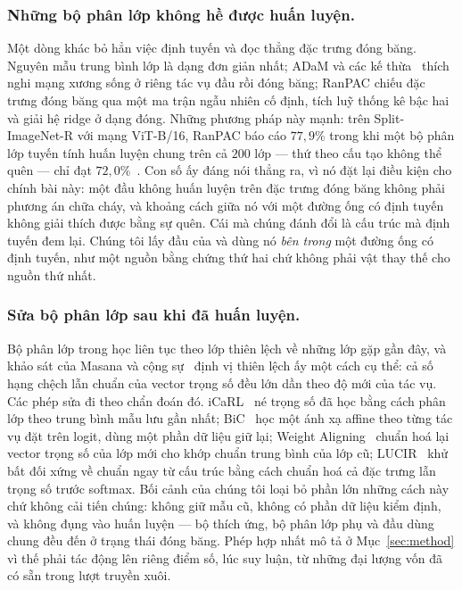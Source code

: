 \documentclass[runningheads]{llncs}
\begin{document}
\subsubsection{Những bộ phân lớp không hề được huấn luyện.}
Một dòng khác bỏ hẳn việc định tuyến và đọc thẳng đặc trưng đóng băng. Nguyên
mẫu trung bình lớp là dạng đơn giản nhất; ADaM và các kế thừa~\cite{ref_adam}
thích nghi mạng xương sống ở riêng tác vụ đầu rồi đóng băng; RanPAC
\cite{ref_ranpac} chiếu đặc trưng đóng băng qua một ma trận ngẫu nhiên cố định,
tích luỹ thống kê bậc hai và giải hệ ridge ở dạng đóng. Những phương pháp này
mạnh: trên Split-ImageNet-R với mạng ViT-B/16, RanPAC báo cáo $77{,}9\%$ trong
khi một bộ phân lớp tuyến tính huấn luyện chung trên cả $200$ lớp --- thứ theo
cấu tạo không thể quên --- chỉ đạt $72{,}0\%$~\cite{ref_ranpac}. Con số ấy đáng
nói thẳng ra, vì nó đặt lại điều kiện cho chính bài này: một đầu không huấn
luyện trên đặc trưng đóng băng không phải phương án chữa cháy, và khoảng cách
giữa nó với một đường ống có định tuyến không giải thích được bằng sự quên. Cái
mà chúng đánh đổi là cấu trúc mà định tuyến đem lại. Chúng tôi lấy đầu của
\cite{ref_ranpac} và dùng nó \emph{bên trong} một đường ống có định tuyến, như
một nguồn bằng chứng thứ hai chứ không phải vật thay thế cho nguồn thứ nhất.

\subsubsection{Sửa bộ phân lớp sau khi đã huấn luyện.}
Bộ phân lớp trong học liên tục theo lớp thiên lệch về những lớp gặp gần đây, và
khảo sát của Masana và cộng sự~\cite{ref_survey} định vị thiên lệch ấy một cách
cụ thể: cả số hạng chệch lẫn chuẩn của vector trọng số đều lớn dần theo độ mới
của tác vụ. Các phép sửa đi theo chẩn đoán đó. iCaRL~\cite{ref_icarl} né trọng
số đã học bằng cách phân lớp theo trung bình mẫu lưu gần nhất; BiC~\cite{ref_bic}
học một ánh xạ affine theo từng tác vụ đặt trên logit, dùng một phần dữ liệu giữ
lại; Weight Aligning~\cite{ref_wa} chuẩn hoá lại vector trọng số của lớp mới cho
khớp chuẩn trung bình của lớp cũ; LUCIR~\cite{ref_lucir} khử bất đối xứng về
chuẩn ngay từ cấu trúc bằng cách chuẩn hoá cả đặc trưng lẫn trọng số trước
softmax. Bối cảnh của chúng tôi loại bỏ phần lớn những cách này chứ không cải
tiến chúng: không giữ mẫu cũ, không có phần dữ liệu kiểm định, và không đụng vào
huấn luyện --- bộ thích ứng, bộ phân lớp phụ và đầu dùng chung đều đến ở trạng
thái đóng băng. Phép hợp nhất mô tả ở Mục~\ref{sec:method} vì thế phải tác động
lên riêng điểm số, lúc suy luận, từ những đại lượng vốn đã có sẵn trong lượt
truyền xuôi.
\end{document}
